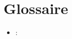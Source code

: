 
\chapter{Glossaire}


\begin{itemize}[leftmargin=1cm, label=, itemsep=2pt]
\item {\bf } :
\end{itemize}


